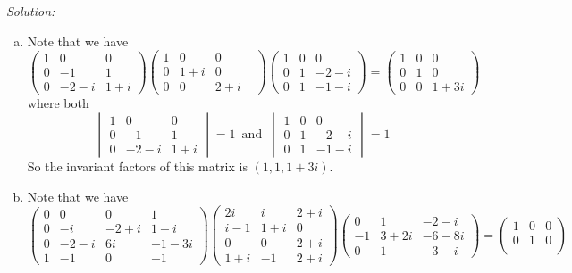 \documentclass[a4paper, 12pt]{article}
\newenvironment{solution}
    {\textit{Solution:}}
    {}
\begin{document}
\begin{solution}
\begin{enumerate}[(a)]
\item Note that we have 
\[\begin{pmatrix}
	1&0&0\\ 
	0&-1&1\\ 
	0&-2-i&1+i
\end{pmatrix}\begin{pmatrix}
	1&0&0\\ 
	0&1+i&0\\ 
	0&0&2+i&
\end{pmatrix}\begin{pmatrix}
	1&0&0\\ 
	0&1&-2-i\\ 
	0&1&-1-i
\end{pmatrix}=\begin{pmatrix}
	1&0&0\\ 
	0&1&0\\ 
	0&0&1+3i
\end{pmatrix}\]
where both 
\[\begin{vmatrix}
	1&0&0\\ 
	0&-1&1\\ 
	0&-2-i&1+i
\end{vmatrix}=1\,\,\, \text{and}\,\,\, \begin{vmatrix}
	1&0&0\\ 
	0&1&-2-i\\ 
	0&1&-1-i
\end{vmatrix}=1\]
So the invariant factors of this matrix is \((1,1,1+3i)\).
\item Note that we have 
\[\begin{pmatrix}
	0&0&0&1\\ 
	0&-i&-2+i&1-i\\ 
	0&-2-i&6i&-1-3i\\ 
	1&-1&0&-1
\end{pmatrix}\begin{pmatrix}
	2i&i&2+i\\ 
	i-1&1+i&0\\
	0&0&2+i\\ 
	1+i&-1&2+i
\end{pmatrix}\begin{pmatrix}
	0&1&-2-i\\ 
	-1&3+2i&-6-8i\\ 
	0&1&-3-i
\end{pmatrix}=\begin{pmatrix}
	1&0&0\\ 
	0&1&0\\ 

\end{pmatrix}\]
\end{enumerate}
\end{solution}
\end{document}
